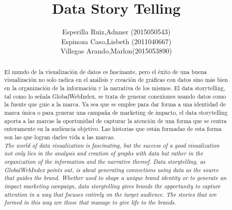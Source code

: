 \documentclass[preprint,12pt]{elsarticle}
\begin{document}
	\begin{frontmatter}
		
		
		\title{\huge Data Story Telling}
		
		
		\author{Esperilla Ruiz,Adnner (2015050543)  
			\\Espinoza Caso,Lisbeth (2011040667)
			\\Villegas Arando,Marlon(2015053890)  }
		
		\address{Tacna, Peru}
		
				
		\begin{abstract}
			
			El mundo de la visualización de datos es fascinante, pero el éxito de una buena visualización no solo radica en el análisis y creación de gráficas con datos sino más bien en la organización de la información y la narrativa de los mismos. 
			El data storytelling, tal como lo señala GlobalWebIndex, se trata de generar conexiones usando datos como la fuente que guíe a la marca. Ya sea que se emplee para dar forma a una identidad de marca única o para generar una campaña de marketing de impacto, el data storytelling aporta a las marcas la oportunidad de capturar la atención de una forma que se centra enteramente en la audiencia objetivo. Las historias que están formadas de esta forma son las que logran darles vida a las marcas.\\
			
			\textit{The world of data visualization is fascinating, but the success of a good visualization not only lies in the analysis and creation of graphs with data but rather in the organization of the information and the narrative thereof.
			Data storytelling, as GlobalWebIndex points out, is about generating connections using data as the source that guides the brand. Whether used to shape a unique brand identity or to generate an impact marketing campaign, data storytelling gives brands the opportunity to capture attention in a way that focuses entirely on the target audience. The stories that are formed in this way are those that manage to give life to the brands.}
						
		\end{abstract}
		
	\end{frontmatter}
	
	\newpage
\end{document}
